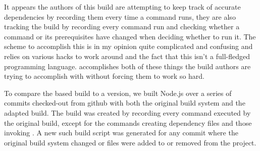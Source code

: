 
It appears the authors of this build are attempting to keep track of accurate dependencies by recording them every time a command runs, they are also tracking the build by recording every command run and checking whether a command or its prerequisites have changed when deciding whether to run it.  The scheme to accomplish this is in my opinion quite complicated and confusing and relies on various hacks to work around \Make and the fact that this isn't a full-fledged programming language.  \Rattle accomplishes both of these things the build authors are trying to accomplish with \Make without forcing them to work so hard.

To compare the \Make based build to a \Rattle version, we built Node.js over a series of commits checked-out from github with both the original build system and the adapted \Rattle build.  The \Rattle build was created by recording every command executed by the original build, except for the commands creating dependency files and those invoking \Make.  A new such \Rattle build script was generated for any commit where the original build system changed or files were added to or removed from the project.











